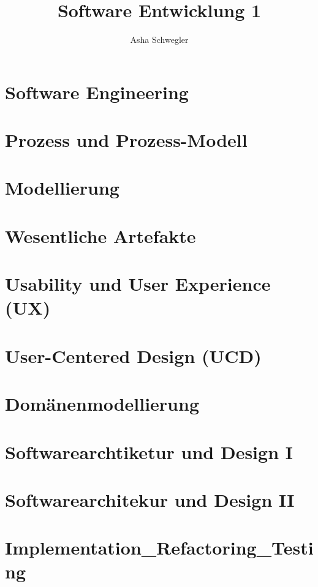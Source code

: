 \documentclass{article}
\title{Software Entwicklung 1}
\author{Asha Schwegler}
\begin{document}
\maketitle
\tableofcontents
\newpage


\section{Software Engineering}





\section{Prozess und Prozess-Modell}



\section{Modellierung}


\section{Wesentliche Artefakte}



\section{Usability und User Experience (UX)}


\section{User-Centered Design (UCD)}




\section{Domänenmodellierung}




\section{Softwarearchtiketur und Design I}


\section{Softwarearchitekur und Design II}


\section{Implementation_Refactoring_Testing}

\end{document}
